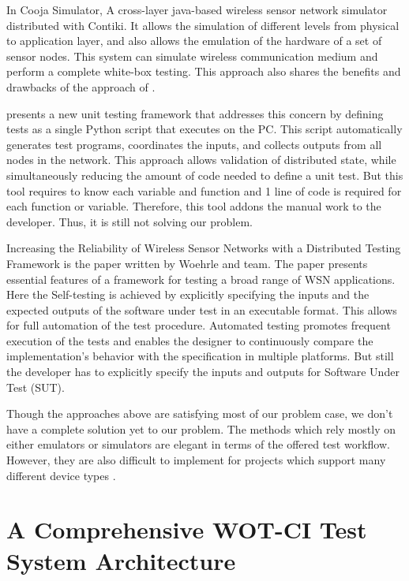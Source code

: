 \documentclass[conference]{IEEEtran}
\theoremstyle{definition}
\begin{document}
In \cite{osterlind2006cross} Cooja Simulator, A cross-layer java-based wireless sensor network simulator distributed with Contiki. 
It allows the simulation of different levels from physical to application layer, and also allows the emulation of the hardware of a set of sensor nodes. 
This system can simulate wireless communication medium and perform a complete white-box testing. 
This approach also shares the benefits and drawbacks of the approach of \cite{karlesky2007mocking}.
 
\cite{okola2010unit} presents a new unit testing framework that addresses this concern by defining tests as a single Python script that executes on the PC. 
This script automatically generates test programs, coordinates the inputs, and collects outputs from all nodes in the network. 
This approach allows validation of distributed state, while simultaneously reducing the amount of code needed to define a unit test. 
But this tool requires to know each variable and function and 1 line of code is required for each function or variable. 
Therefore, this tool addons the manual work to the developer. 
Thus, it is still not solving our problem.

Increasing the Reliability of Wireless Sensor Networks with a Distributed Testing Framework is the paper written by Woehrle and team. 
The paper presents essential features of a framework for testing a broad range of WSN applications. 
Here the Self-testing is achieved by explicitly specifying the inputs and the expected outputs of the software under test in an executable format. 
This allows for full automation of the test procedure. 
Automated testing promotes frequent execution of the tests and enables the designer to continuously compare the implementation’s behavior with the specification in multiple platforms. 
But still the developer has to explicitly specify the inputs and outputs for Software Under Test (SUT).

Though the approaches above are satisfying most of our problem case, we don’t have a complete solution yet to our problem. 
The methods which rely mostly on either emulators or simulators are elegant in terms of the offered test workflow. 
However, they are also difficult to implement for projects which support many different device types \cite{rosenkranz2015distributed}.

\section{A Comprehensive WOT-CI Test System Architecture}
\end{document}
